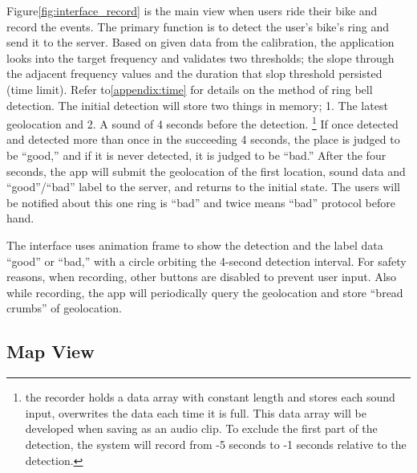 Figure\ref{fig:interface_record} is the main view when users ride their bike and
record the events. The primary function is to detect the user's bike's ring
and send it to the server. Based on given data from the calibration, the
application looks into the target frequency and validates two thresholds;
the slope through the adjacent frequency values and the duration that slop
threshold persisted (time limit).
Refer to\ref{appendix:time} for details on the method of ring bell detection.
The initial detection will store two things in memory; 1. The latest
geolocation and 2. A sound of 4 seconds before the detection.
\footnote{the recorder holds a data array with constant length and stores
  each sound input, overwrites the data each time it is full. This data array
  will be developed when saving as an audio clip. To exclude the first part
  of the detection, the system will record from -5 seconds to -1 seconds
relative to the detection.}
If once detected and  detected more than once in the succeeding 4 seconds,
the place is judged to be ``good,'' and if it is never detected, it is
judged to be ``bad.'' After the four seconds, the app will submit the
geolocation of the first location, sound data and ``good''/``bad'' label to the server, and returns to the initial state.
The users will be notified about this one ring is ``bad'' and twice means
``bad'' protocol before hand.

The interface uses animation frame to show the detection and the label data
``good'' or ``bad,'' with a circle orbiting the 4-second detection interval.
For safety reasons, when recording, other buttons are disabled to prevent
user input. Also while recording, the app will periodically query the
geolocation and store ``bread crumbs'' of geolocation.

\subsection{Map View}

